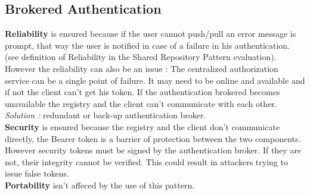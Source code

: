 \subsection{Brokered Authentication}
\textbf{Reliability} is ensured because if the user cannot push/pull an error message is prompt, that way the user is notified in case of a failure in his authentication. (see definition of Reliability in the Shared Repository Pattern evaluation).\\
However the reliability can also be an issue :
The centralized authorization service can be a single point of failure. It may need to be online and available and if not the client can't get his token. If the authentication brokered becomes unavailable the registry and the client can't communicate with each other.
\textit{Solution :} redundant or back-up authentication broker. \\
\textbf{Security} is ensured because the registry and the client don't communicate directly, the Bearer token is a barrier of protection between the two components.\\
However security tokens must be signed by the authentication broker. If they are not, their integrity cannot be verified. This could result in attackers trying to issue false tokens. \\
\textbf{Portability} isn't affeced by the use of this pattern. \\



